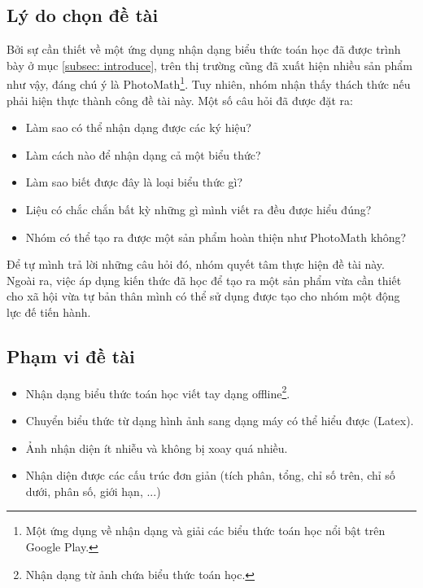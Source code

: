 \documentclass[a4paper,12pt]{article}
\begin{document}
	
	
	\subsection{Lý do chọn đề tài}
	Bởi sự cần thiết về một ứng dụng nhận dạng biểu thức toán học đã được trình bày ở mục \ref{subsec: introduce}, trên thị trường cũng đã xuất hiện nhiều sản phẩm như vậy, đáng chú ý là PhotoMath\footnote{Một ứng dụng về nhận dạng và giải các biểu thức toán học nổi bật trên Google Play.}. Tuy nhiên, nhóm nhận thấy thách thức nếu phải hiện thực thành công đề tài này. Một số câu hỏi đã được đặt ra:\\
	\begin{itemize}
		\item Làm sao có thể nhận dạng được các ký hiệu?
		\item Làm cách nào để nhận dạng cả một biểu thức?
		\item Làm sao biết được đây là loại biểu thức gì?
		\item Liệu có chắc chắn bất kỳ những gì mình viết ra đều được hiểu đúng? 
		\item Nhóm có thể tạo ra được một sản phẩm hoàn thiện như PhotoMath không?
		
	\end{itemize}
	
	Để tự mình trả lời những câu hỏi đó, nhóm quyết tâm thực hiện đề tài này. Ngoài ra, việc áp dụng kiến thức đã học để tạo ra một sản phẩm vừa cần thiết cho xã hội vừa tự bản thân mình có thể sử dụng được tạo cho nhóm một động lực đế tiến hành. 
	
	\subsection{Phạm vi đề tài}
	
	\begin{itemize}
		\item Nhận dạng biểu thức toán học viết tay dạng offline\footnote{Nhận dạng từ ảnh chứa biểu thức toán học.}.
		\item Chuyển biểu thức từ dạng hình ảnh sang dạng máy có thể hiểu được (Latex).
		\item Ảnh nhận diện ít nhiễu và không bị xoay quá nhiều.
		\item Nhận diện được các cấu trúc đơn giản (tích phân, tổng, chỉ số trên, chỉ số dưới, phân số, giới hạn, ...)
		
	\end{itemize}
	
\end{document}
